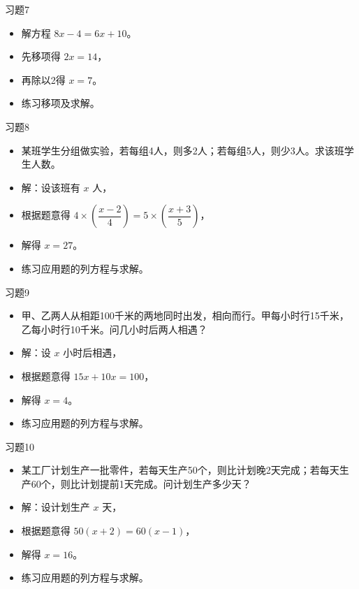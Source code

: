 \documentclass{ctexbeamer}
\begin{document}
\begin{frame}{习题7}
  \begin{itemize}
    \item 解方程 \(8x - 4 = 6x + 10\)。
    \item 先移项得 \(2x = 14\)，
    \item 再除以2得 \(x = 7\)。
    \item 练习移项及求解。
  \end{itemize}
\end{frame}

\begin{frame}{习题8}
  \begin{itemize}
    \item 某班学生分组做实验，若每组4人，则多2人；若每组5人，则少3人。求该班学生人数。
    \item 解：设该班有 \(x\) 人，
    \item 根据题意得 \(4 \times \left(\dfrac{x - 2}{4}\right) = 5 \times \left(\dfrac{x + 3}{5}\right)\)，
    \item 解得 \(x = 27\)。
    \item 练习应用题的列方程与求解。
  \end{itemize}
\end{frame}

\begin{frame}{习题9}
  \begin{itemize}
    \item 甲、乙两人从相距100千米的两地同时出发，相向而行。甲每小时行15千米，乙每小时行10千米。问几小时后两人相遇？
    \item 解：设 \(x\) 小时后相遇，
    \item 根据题意得 \(15x + 10x = 100\)，
    \item 解得 \(x = 4\)。
    \item 练习应用题的列方程与求解。
  \end{itemize}
\end{frame}

\begin{frame}{习题10}
  \begin{itemize}
    \item 某工厂计划生产一批零件，若每天生产50个，则比计划晚2天完成；若每天生产60个，则比计划提前1天完成。问计划生产多少天？
    \item 解：设计划生产 \(x\) 天，
    \item 根据题意得 \(50(x + 2) = 60(x - 1)\)，
    \item 解得 \(x = 16\)。
    \item 练习应用题的列方程与求解。
  \end{itemize}
\end{frame}
\end{document}
